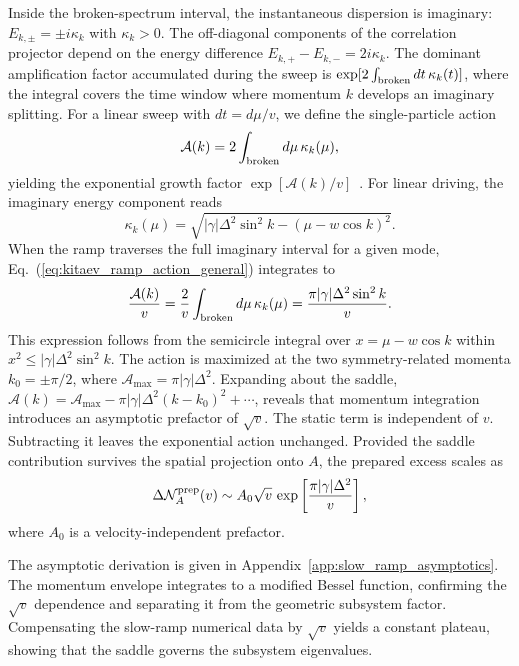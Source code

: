 \documentclass[aps,prb,reprint,superscriptaddress,amsmath,amssymb,floatfix]{revtex4-2}
\begin{document}
Inside the broken-spectrum interval, the instantaneous dispersion is imaginary: $E_{k,\pm}=\pm i\kappa_k$ with $\kappa_k>0$. The off-diagonal components of the correlation projector depend on the energy difference $E_{k,+}-E_{k,-}=2i\kappa_k$. The dominant amplification factor accumulated during the sweep is $\exp[2\int_{\rm broken}dt\,\kappa_k(t)]$, where the integral covers the time window where momentum $k$ develops an imaginary splitting. For a linear sweep with $dt=d\mu/v$, we define the single-particle action
\begin{equation}
\mathcal A(k) = 2\int_{\rm broken}d\mu\,\kappa_k(\mu),
\label{eq:kitaev_ramp_action_general}
\end{equation}
yielding the exponential growth factor $\exp[\mathcal A(k)/v]$~\cite{WangLangChong2018}.
%
 For linear driving, the imaginary energy component reads
\begin{equation}
\kappa_k(\mu) = \sqrt{ |\gamma|\Delta^2\sin^2k - (\mu-w\cos k)^2 }.
\label{eq:kappa_ramp}
\end{equation}
When the ramp traverses the full imaginary interval for a given mode, Eq.~(\ref{eq:kitaev_ramp_action_general}) integrates to
\begin{equation}
\frac{\mathcal A(k)}{v} = \frac{2}{v} \int_{\rm broken}d\mu\,\kappa_k(\mu) = \frac{\pi|\gamma|\Delta^2\sin^2k}{v}.
\label{eq:ramp_action}
\end{equation}
This expression follows from the semicircle integral over $x=\mu-w\cos k$ within $x^2\le {\vert{}\gamma\vert{}}\Delta^2 \sin^2 k$. The action is maximized at the two symmetry-related momenta $k_0=\pm\pi/2$, where $\mathcal A_{\max}=\pi\vert{}\gamma\vert{}\Delta^2$. Expanding about the saddle, $\mathcal A(k)=\mathcal A_{\max}-\pi\vert{}\gamma\vert{}\Delta^2(k-k_0)^2+\cdots$, reveals that momentum integration introduces an asymptotic prefactor of $\sqrt v$.
%
The static term is independent of $v$. Subtracting it leaves the exponential action unchanged. Provided the saddle contribution survives the spatial projection onto $A$, the prepared excess scales as
\begin{equation}
\Delta\mathcal N_A^{\rm prep}(v) \sim A_0\sqrt v\, \exp\left[ \frac{\pi|\gamma|\Delta^2}{v} \right],
\label{eq:velocity_scaling}
\end{equation}
where $A_0$ is a velocity-independent prefactor.

The asymptotic derivation is given in Appendix~\ref{app:slow_ramp_asymptotics}. The momentum envelope integrates to a modified Bessel function, confirming the $\sqrt v$ dependence and separating it from the geometric subsystem factor. Compensating the slow-ramp numerical data by $\sqrt v$ yields a constant plateau, showing that the saddle governs the subsystem eigenvalues.
\end{document}
